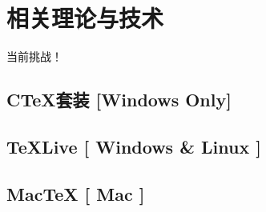 \chapter{相关理论与技术}
当前挑战！

\section{C\TeX{}套装 [Windows Only]}


\section{\TeX{}Live [ Windows \& Linux ]}



\section{Mac\TeX{} [ Mac ]}
